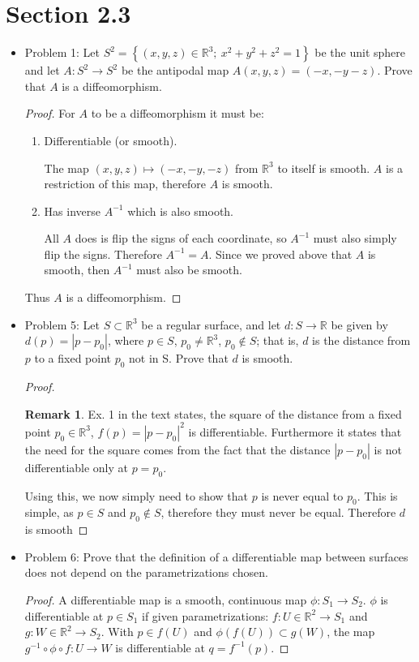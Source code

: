 \documentclass[a4paper,17pt]{extarticle}
\title{\scalebox{2}{Math 553 Homework 4}}
\author{\scalebox{1.5}{Theo Koss}}
\date{April 2022}
\theoremstyle{definition}
\renewcommand{\skip}{\par\null\par}
\newtheorem*{remark}{Remark}
\newcommand{\R}{\mathbb{R}}
\begin{document}
\maketitle
\section{Section 2.3}
\begin{itemize}
    \item Problem 1: Let $S^2=\left\{(x,y,z)\in \R^3;\ x^2+y^2+z^2=1 \right\}$ be the unit sphere and let $A:S^2\to S^2$ be the antipodal map $A(x,y,z)=(-x,-y-z)$. Prove that $A$ is a diffeomorphism.\begin{proof} For $A$ to be a diffeomorphism it must be:\begin{enumerate}
        \item Differentiable (or smooth).\skip The map $(x,y,z)\mapsto(-x,-y,-z)$ from $\R^3$ to itself is smooth. $A$ is a restriction of this map, therefore $A$ is smooth.
        \item Has inverse $A^{-1}$ which is also smooth.\skip All $A$ does is flip the signs of each coordinate, so $A^{-1}$ must also simply flip the signs. Therefore $A^{-1}=A$. Since we proved above that $A$ is smooth, then $A^{-1}$ must also be smooth.
    \end{enumerate}
    Thus $A$ is a diffeomorphism.
    \end{proof}
    \item Problem 5: Let $S\subset\R^3$ be a regular surface, and let $d: S\to\R$ be given by $d(p)=|p-p_0|$, where $p\in S$, $p_0\neq\R^3$, $p_0\notin S$; that is, $d$ is the distance from $p$ to a fixed point $p_0$ not in S. Prove that $d$ is smooth.\begin{proof}\begin{remark}Ex. 1 in the text states, the square of the distance from a fixed point $p_0\in\R^3$, $f(p)=|p-p_0|^2$ is differentiable. Furthermore it states that the need for the square comes from the fact that the distance $|p-p_0|$ is not differentiable only at $p=p_0$.\end{remark}\skip Using this, we now simply need to show that $p$ is never equal to $p_0$. This is simple, as $p\in S$ and $p_0\notin S$, therefore they must never be equal. Therefore $d$ is smooth
    \end{proof}
    \item Problem 6: Prove that the definition of a differentiable map between surfaces does not depend on the parametrizations chosen.\begin{proof}A differentiable map is a smooth, continuous map $\phi:S_1\to S_2$. $\phi$ is differentiable at $p\in S_1$ if given parametrizations: $f:U\in\R^2\to S_1$ and $g:W\in\R^2\to S_2$. With $p\in f(U)$ and $\phi(f(U))\subset g(W)$, the map $g^{-1}\circ\phi\circ f:U\to W$ is differentiable at $q=f^{-1}(p)$.

\end{proof}
\end{itemize}
\end{document}
